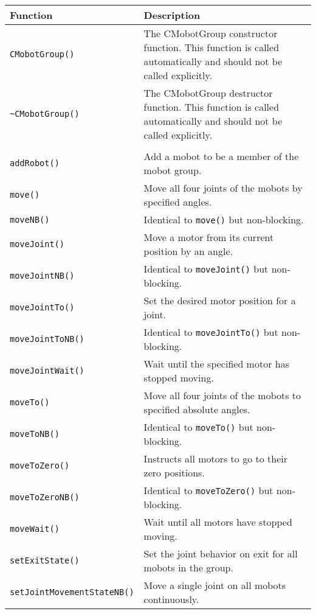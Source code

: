 \begin{tabular}{p{1.75in}p{4.5in}}
\hline
Function & Description \\
\hline
\texttt{CMobotGroup()} & The CMobotGroup constructor function. This function
is called automatically and should not be called explicitly. \\
\texttt{\textasciitilde CMobotGroup()} & The CMobotGroup destructor function. This function
is called automatically and should not be called explicitly. \\
& \\
\texttt{addRobot()} & Add a mobot to be a member of the mobot group. \\
\texttt{move()} & Move all four joints of the mobots by specified angles. \\
\texttt{moveNB()} & Identical to \texttt{move()} but non-blocking. \\
\texttt{moveJoint()} & Move a motor from its current position by an angle. \\
\texttt{moveJointNB()} & Identical to \texttt{moveJoint()} but non-blocking. \\
\texttt{moveJointTo()} & Set the desired motor position for a joint. \\
\texttt{moveJointToNB()} & Identical to \texttt{moveJointTo()} but non-blocking. \\
\texttt{moveJointWait()} & Wait until the specified motor has stopped moving. \\
\texttt{moveTo()} & Move all four joints of the mobots to specified absolute angles. \\
\texttt{moveToNB()} & Identical to \texttt{moveTo()} but non-blocking. \\
\texttt{moveToZero()} & Instructs all motors to go to their zero positions. \\
\texttt{moveToZeroNB()} & Identical to \texttt{moveToZero()} but non-blocking. \\
\texttt{moveWait()} & Wait until all motors have stopped moving. \\
\texttt{setExitState()} & Set the joint behavior on exit for all mobots in the group. \\
\texttt{setJointMovementStateNB()} & Move a single joint on all mobots continuously. \\

\end{tabular}
